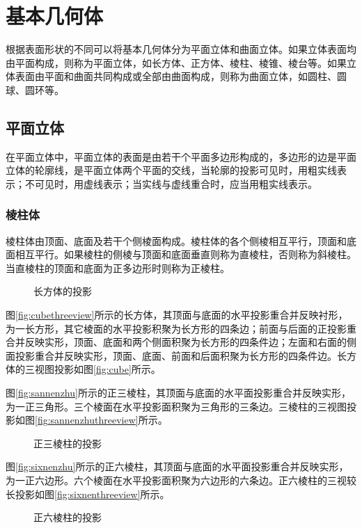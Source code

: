 \section{基本几何体}

根据表面形状的不同可以将基本几何体分为平面立体和曲面立体。如果立体表面均由平面构成，则称为平面立体，如长方体、正方体、棱柱、棱锥、棱台等。如果立体表面由平面和曲面共同构成或全部由曲面构成，则称为曲面立体，如圆柱、圆球、圆环等。
\subsection{平面立体}
在平面立体中，平面立体的表面是由若干个平面多边形构成的，多边形的边是平面立体的轮廓线，是平面立体两个平面的交线，当轮廓的投影可见时，用粗实线表示；不可见时，用虚线表示；当实线与虚线重合时，应当用粗实线表示。
\subsubsection{棱柱体}
棱柱体由顶面、底面及若干个侧棱面构成。棱柱体的各个侧棱相互平行，顶面和底面相互平行。如果棱柱的侧棱与顶面和底面垂直则称为直棱柱，否则称为斜棱柱。当直棱柱的顶面和底面为正多边形时则称为正棱柱。
\begin{figure}[htbp]
\centering
{}\hspace{30pt}
\caption{长方体的投影}
\end{figure}

图\ref{fig:cubethreeview}所示的长方体，其顶面与底面的水平投影重合并反映衬形，为一长方形，其它棱面的水平投影积聚为长方形的四条边；前面与后面的正投影重合并反映实形，顶面、底面和两个侧面积聚为长方形的四条件边；左面和右面的侧面投影重合并反映实形，顶面、底面、前面和后面积聚为长方形的四条件边。长方体的三视图投影如图\ref{fig:cube}所示。

图\ref{fig:sannenzhu}所示的正三棱柱，其顶面与底面的水平面投影重合并反映实形，为一正三角形。三个棱面在水平投影面积聚为三角形的三条边。三棱柱的三视图投影如图\ref{fig:sannenzhuthreeview}所示。
\begin{figure}[htbp]
\centering
{}\hspace{30pt}
\caption{正三棱柱的投影}
\end{figure}

图\ref{fig:sixnenzhu}所示的正六棱柱，其顶面与底面的水平面投影重合并反映实形，为一正六边形。六个棱面在水平投影面积聚为六边形的六条边。正六棱柱的三视较长投影如图\ref{fig:sixnenthreeview}所示。
\begin{figure}[htbp]
\centering
{}\hspace{30pt}
\caption{正六棱柱的投影}
\end{figure}

